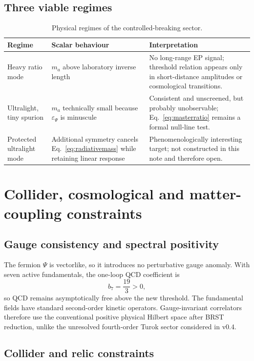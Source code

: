 \documentclass[11pt,a4paper]{article}
\begin{document}
\subsection{Three viable regimes}

\begin{table}[H]
\centering
\caption{Physical regimes of the controlled-breaking sector.}
\begin{tabularx}{\textwidth}{@{}L{0.22\textwidth}L{0.23\textwidth}Y@{}}
\toprule
Regime & Scalar behaviour & Interpretation \\
\midrule
Heavy ratio mode & $m_a$ above laboratory inverse length & No long-range EP signal; threshold relation appears only in short-distance amplitudes or cosmological transitions. \\
Ultralight, tiny spurion & $m_a$ technically small because $\varepsilon_\Psi$ is minuscule & Consistent and unscreened, but probably unobservable; Eq.~\eqref{eq:masterratio} remains a formal null-line test. \\
Protected ultralight mode & Additional symmetry cancels Eq.~\eqref{eq:radiativemass} while retaining linear response & Phenomenologically interesting target; not constructed in this note and therefore open. \\
\bottomrule
\end{tabularx}
\end{table}

\section{Collider, cosmological and matter-coupling constraints}

\subsection{Gauge consistency and spectral positivity}

The fermion $\Psi$ is vectorlike, so it introduces no perturbative gauge anomaly. With seven active fundamentals, the one-loop QCD coefficient is
\[
b_7=\frac{19}{3}>0,
\]
so QCD remains asymptotically free above the new threshold. The fundamental fields have standard second-order kinetic operators. Gauge-invariant correlators therefore use the conventional positive physical Hilbert space after BRST reduction, unlike the unresolved fourth-order Turok sector considered in v0.4.

\subsection{Collider and relic constraints}
\end{document}

